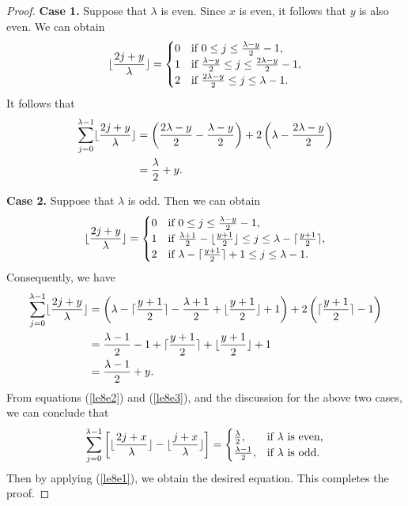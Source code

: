 \documentclass[journal,onecolumn]{IEEEtran}
\begin{document}
\begin{proof}
\textbf{Case 1.} Suppose that $\lambda$ is even. Since $x$ is even, it follows that  $y$ is also even. We can obtain 
\begin{equation}\notag
    \lfloor \frac{2j+y}{\lambda} \rfloor =\begin{cases}
        0&\hbox{if }0\leq j\leq \frac{\lambda-y}{2}-1, \\
        1&\hbox{if }\frac{\lambda-y}{2}\leq j \leq \frac{2\lambda-y}{2}-1, \\
        2 &\hbox{if }  \frac{2\lambda-y}{2} \leq j \leq \lambda -1. 
   \end{cases}   
\end{equation}
It follows that 
\begin{equation}\notag
\begin{split}
\sum\limits_{j=0}^{\lambda-1}\lfloor \frac{2j+y}{\lambda} \rfloor &=  \left(\frac{2\lambda-y}{2}- \frac{\lambda-y}{2}\right)+2\left(\lambda - \frac{2\lambda-y}{2}\right)  \\ &=\frac{\lambda}{2}+y.
\end{split}
\end{equation}

\textbf{Case 2.} Suppose that $\lambda$ is odd. Then we can obtain 
\begin{equation}\notag
    \lfloor \frac{2j+y}{\lambda} \rfloor =\begin{cases}
        0&\hbox{if }0\leq j\leq \frac{\lambda-y}{2}-1, \\
        1&\hbox{if }\frac{\lambda+1}{2}-\lfloor \frac{y+1}{2}\rfloor\leq j \leq \lambda-\lceil \frac{y+1}{2}\rceil, \\
        2 &\hbox{if } \lambda -\lceil \frac{y+1}{2} \rceil +1 \leq j \leq \lambda -1. 
   \end{cases}   
\end{equation}
Consequently,  we have 
\begin{equation}\notag
\begin{split}
\sum\limits_{j=0}^{\lambda-1}\lfloor \frac{2j+y}{\lambda} \rfloor  &= \left( \lambda-\lceil \frac{y+1}{2}\rceil -\frac{\lambda+1}{2}+ \lfloor \frac{y+1}{2}\rfloor +1 \right) + 2 \left(\lceil \frac{y+1}{2}\rceil  - 1 \right) \\
&= \frac{\lambda-1}{2}-1+\lceil \frac{y+1}{2}\rceil+\lfloor \frac{y+1}{2}\rfloor +1\\
&= \frac{\lambda-1}{2}+y.
\end{split}
\end{equation}
From equations (\ref{le8e2}) and (\ref{le8e3}), and the discussion for the above two cases, we can conclude that 
\begin{equation}\notag    \sum\limits_{j=0}^{\lambda-1}\left[\lfloor \frac{2j+x}{\lambda} \rfloor-\lfloor \frac{j+x}{\lambda}\rfloor \right] =\begin{cases}
        \frac{\lambda}{2},& \hbox{if  }
\lambda \hbox{ is even,}   \\
\frac{\lambda-1}{2},& \hbox{if  }
\lambda \hbox{ is odd.}
\end{cases}
\end{equation}
Then by applying (\ref{le8e1}), we obtain the desired equation.  This completes the proof. 
\end{proof}
\end{document}
